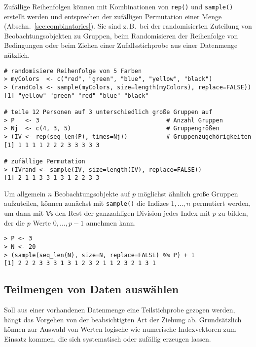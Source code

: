 Zufällige Reihenfolgen können mit Kombinationen von \lstinline!rep()! und \lstinline!sample()! erstellt werden und entsprechen der zufälligen Permutation einer Menge (Abschn.\ \ref{sec:combinatorics}). Sie sind z.\,B.\ bei der randomisierten Zuteilung von Beobachtungsobjekten zu Gruppen, beim Randomisieren der Reihenfolge von Bedingungen oder beim Ziehen einer Zufallsstichprobe aus einer Datenmenge nützlich.
\begin{lstlisting}
# randomisiere Reihenfolge von 5 Farben
> myColors  <- c("red", "green", "blue", "yellow", "black")
> (randCols <- sample(myColors, size=length(myColors), replace=FALSE))
[1] "yellow" "green" "red" "blue" "black"

# teile 12 Personen auf 3 unterschiedlich große Gruppen auf
> P   <- 3                                    # Anzahl Gruppen
> Nj  <- c(4, 3, 5)                           # Gruppengrößen
> (IV <- rep(seq_len(P), times=Nj))           # Gruppenzugehörigkeiten
[1] 1 1 1 1 2 2 2 3 3 3 3 3

# zufällige Permutation
> (IVrand <- sample(IV, size=length(IV), replace=FALSE))
[1] 2 1 1 3 3 1 3 1 2 2 3 3
\end{lstlisting}

Um allgemein $n$ Beobachtungsobjekte auf $p$ möglichst ähnlich große Gruppen aufzuteilen, können zunächst mit \lstinline!sample()! die Indizes $1, \ldots, n$ permutiert werden, um dann mit \lstinline!%%! den Rest der ganzzahligen Division jedes Index mit $p$ zu bilden, der die $p$ Werte $0, \ldots, p-1$ annehmen kann.
\begin{lstlisting}
> P <- 3
> N <- 20
> (sample(seq_len(N), size=N, replace=FALSE) %% P) + 1
[1] 2 2 2 3 3 3 1 3 1 2 3 2 1 1 2 3 2 1 3 1
\end{lstlisting}

\subsection{Teilmengen von Daten auswählen}

Soll aus einer vorhandenen Datenmenge eine Teilstichprobe gezogen werden, hängt das Vorgehen von der beabsichtigten Art der Ziehung ab. Grundsätzlich können zur Auswahl von Werten logische wie numerische Indexvektoren zum Einsatz kommen, die sich systematisch oder zufällig erzeugen lassen.

